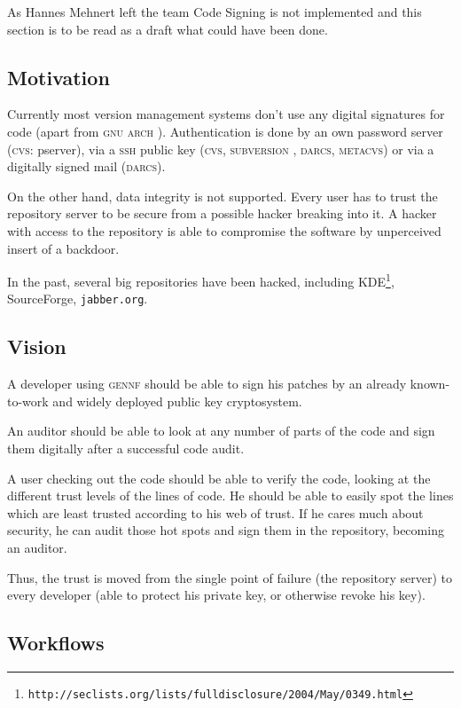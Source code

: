 \documentclass[fleqn, 10pt, a4paper]{report} \usepackage{amssymb}
\begin{document}
As Hannes Mehnert left the team Code Signing is not implemented and
this section is to be read as a draft what could have been done.


\subsection{Motivation}

Currently most version management systems don't use any digital
signatures for code (apart from \textsc{gnu arch} \cite{Gnua06}).
Authentication is done
by an own password server (\textsc{cvs}: pserver), via a \textsc{ssh} public
key (\textsc{cvs}, \textsc{subversion} \cite{Subv06}, \textsc{darcs},
\textsc{metacvs}) or via a digitally signed mail (\textsc{darcs}).

On the other hand, data integrity is not supported.  Every user has to
trust the repository server to be secure from a possible hacker
breaking into it.  A hacker with access to the repository is able to
compromise the software by unperceived insert of a backdoor.

In the past, several big repositories have been hacked, including
KDE\footnote{
  \texttt{http://seclists.org/lists/fulldisclosure/2004/May/0349.html}},
SourceForge, \texttt{jabber.org}.


\subsection{Vision}

A developer using \textsc{gennf} should be able to sign his patches
by an already known-to-work and widely deployed public key
cryptosystem.

An auditor should be able to look at any number of parts of the code
and sign them digitally after a successful code audit.

A user checking out the code should be able to verify the code,
looking at the different trust levels of the lines of code. He should
be able to easily spot the lines which are least trusted according to
his web of trust. If he cares much about security, he can audit those
hot spots and sign them in the repository, becoming an auditor.

Thus, the trust is moved from the single point of failure (the
repository server) to every developer (able to protect his private
key, or otherwise revoke his key).

\subsection{Workflows}
\end{document}

